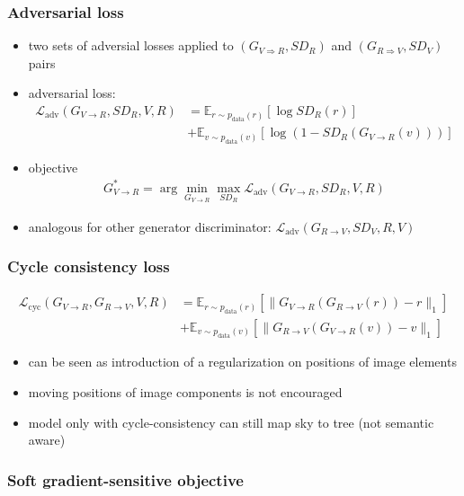 \subsubsection{Adversarial loss}

\begin{itemize}
	\item two sets of adversial losses applied to $(G_{V\Rightarrow R}, SD_R)$ and $(G_{R\Rightarrow V}, SD_V)$ pairs
	\item adversarial loss:
	\begin{align}
		\mathcal{L}_{\text{adv}}(G_{V\rightarrow R}, SD_R, V, R) &= \mathbb{E}_{r\sim p_{\text{data}}(r)}[\log SD_R(r)]\\
		&+ \mathbb{E}_{v\sim p_{\text{data}}(v)}[\log(1-SD_R(G_{V\rightarrow R}(v)))]
	\end{align}
	\item objective
	\begin{align}
		G^*_{V\rightarrow R} = \arg \underset{G_{V\rightarrow R}}{\min} \underset{SD_R}{\max} \mathcal{L}_{\text{adv}}(G_{V\rightarrow R}, SD_R, V, R)
	\end{align}
	\item analogous for other generator discriminator: $\mathcal{L}_{\text{adv}}(G_{R\rightarrow V}, SD_V, R, V)$
\end{itemize}

\subsubsection{Cycle consistency loss}
	\begin{align}
	\mathcal{L}_{\text{cyc}}(G_{V\rightarrow R}, G_{R\rightarrow V}, V, R) &= \mathbb{E}_{r\sim p_{\text{data}}(r)}[\lVert G_{V\rightarrow R}(G_{R\rightarrow V}(r)) - r \rVert_1]\\
	&+ \mathbb{E}_{v\sim p_{\text{data}}(v)}[\lVert G_{R\rightarrow V}(G_{V\rightarrow R}(v)) - v \rVert_1]
\end{align}

\begin{itemize}
	\item can be seen as introduction of a regularization on positions of image elements
	\item moving positions of image components is not encouraged
	\item model only with cycle-consistency can still map sky to tree (not semantic aware)
\end{itemize}

\subsubsection{Soft gradient-sensitive objective}

